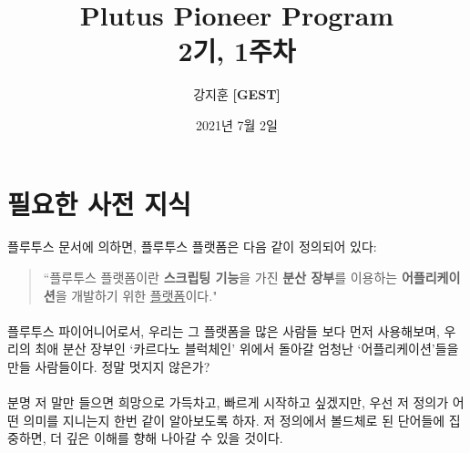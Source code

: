 \documentclass[a4paper, 11pt]{article}
\title{Plutus Pioneer Program \\ \large 2기, 1주차}
\author{강지훈 \textbf{[GEST]}}
\date{2021년 7월 2일}
\begin{document}
    \maketitle

    \section{필요한 사전 지식}
    
    플루투스 문서에 의하면, 플루투스 플랫폼은 다음 같이 정의되어 있다:

    \begin{quotation}
        ``플루투스 플랫폼이란 \textbf{스크립팅 기능}을 가진 \textbf{분산 장부}를 이용하는 \textbf{어플리케이션}을 개발하기 위한 \underline{플랫폼}이다."
    \end{quotation}

    \paragraph{}플루투스 파이어니어로서, 우리는 그 플랫폼을 많은 사람들 보다 먼저 사용해보며, 우리의 최애 분산 장부인 `카르다노 블럭체인' 위에서 돌아갈 엄청난 `어플리케이션'들을 만들 사람들이다. 정말 멋지지 않은가?
    
    \paragraph{} 분명 저 말만 들으면 희망으로 가득차고, 빠르게 시작하고 싶겠지만, 우선 저 정의가 어떤 의미를 지니는지 한번 같이 알아보도록 하자. 저 정의에서 볼드체로 된 단어들에 집중하면, 더 깊은 이해를 향해 나아갈 수 있을 것이다.
\end{document}
